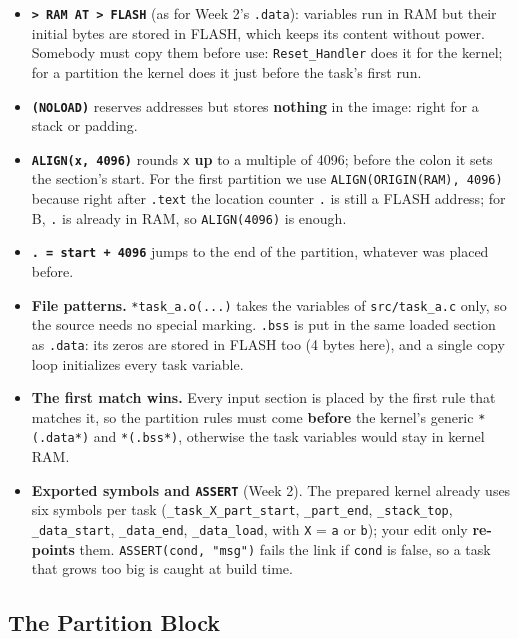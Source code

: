 \begin{itemize}
    \item \textbf{\texttt{> RAM AT > FLASH}} (as for Week 2's \texttt{.data}): variables run in RAM but their initial bytes are stored in FLASH, which keeps its content without power. Somebody must copy them before use: \texttt{Reset\_Handler} does it for the kernel; for a partition the kernel does it just before the task's first run.
    \item \textbf{\texttt{(NOLOAD)}} reserves addresses but stores \textbf{nothing} in the image: right for a stack or padding.
    \item \textbf{\texttt{ALIGN(x, 4096)}} rounds \texttt{x} \textbf{up} to a multiple of 4096; before the colon it sets the section's start. For the first partition we use \texttt{ALIGN(ORIGIN(RAM), 4096)} because right after \texttt{.text} the location counter \texttt{.} is still a FLASH address; for B, \texttt{.} is already in RAM, so \texttt{ALIGN(4096)} is enough.
    \item \textbf{\texttt{. = start + 4096}} jumps to the end of the partition, whatever was placed before.
    \item \textbf{File patterns.} \texttt{*task\_a.o(...)} takes the variables of \texttt{src/task\_a.c} only, so the source needs no special marking. \texttt{.bss} is put in the same loaded section as \texttt{.data}: its zeros are stored in FLASH too (4 bytes here), and a single copy loop initializes every task variable.
    \item \textbf{The first match wins.} Every input section is placed by the first rule that matches it, so the partition rules must come \textbf{before} the kernel's generic \texttt{*(.data*)} and \texttt{*(.bss*)}, otherwise the task variables would stay in kernel RAM.
    \item \textbf{Exported symbols and \texttt{ASSERT}} (Week 2). The prepared kernel already uses six symbols per task (\texttt{\_task\_X\_part\_start}, \texttt{\_part\_end}, \texttt{\_stack\_top}, \texttt{\_data\_start}, \texttt{\_data\_end}, \texttt{\_data\_load}, with \texttt{X} = \texttt{a} or \texttt{b}); your edit only \textbf{re-points} them. \texttt{ASSERT(cond, "msg")} fails the link if \texttt{cond} is false, so a task that grows too big is caught at build time.
\end{itemize}

\subsection{The Partition Block}


